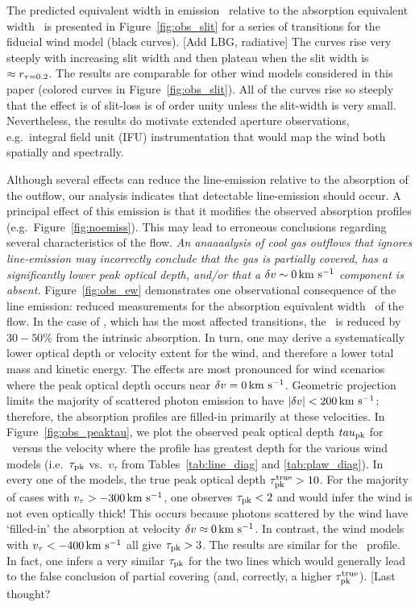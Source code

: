 \documentclass[12pt,preprint]{aastex}
\begin{document}
The predicted equivalent width in emission \ewe\ relative to the absorption
equivalent width \ewabs\ is presented in
Figure~\ref{fig:obs_slit} for a series of transitions for the fiducial
wind model (black curves).
[Add LBG, radiative]
The curves rise very steeply with increasing slit width and then
plateau when the slit width is $\approx r_{\tau = 0.2}$.  
The results are comparable for other wind models considered
in this paper (colored curves in Figure~\ref{fig:obs_slit}).
All of the curves rise so steeply that 
the effect is of slit-loss is of order unity
unless the slit-width is very small.   
Nevertheless, the results do motivate
extended aperture observations, e.g.\ integral field unit (IFU)
instrumentation that would map the wind both spatially and spectrally.


Although several effects can reduce the line-emission
relative to the absorption of the outflow, our analysis
indicates that detectable line-emission should occur. 
A principal effect of this emission is
that it modifies the observed absorption profiles (e.g.\
Figure~\ref{fig:noemiss}). This may lead to erroneous conclusions
regarding several characteristics of the flow.  {\it An anaaaalysis of cool gas outflows
that ignores line-emission may incorrectly conclude that the gas is
partially covered, has a significantly lower peak optical depth,
and/or that a $\delta v \sim 0 \, {\rm km~s^{-1}}$ component is
absent.}  Figure~\ref{fig:obs_ew} demonstrates one observational
consequence of the line emission: reduced measurements for the absorption
equivalent width \ewabs\ of the flow.  In the case of \ion{Mg}{2},
which has the most affected transitions, the \ewabs\ is reduced by
$30-50\%$ from the intrinsic absorption.  In turn, one may derive 
a systematically lower optical depth or velocity extent for the wind,
and therefore a lower total mass and kinetic energy.  
The effects are most pronounced for wind
scenarios where the peak optical depth occurs near $\delta v = 0 \, {\rm km~s^{-1}}$.
Geometric projection limits the majority of scattered photon emission to
have $|\delta v| < 200 \, {\rm km~s^{-1}}$; therefore,  the absorption profiles
are filled-in primarily at these velocities.  In
Figure~\ref{fig:obs_peaktau}, we plot the observed peak optical depth
$tau_{\rm pk}$ for \mgiia\ 
versus the velocity where the profile has greatest depth 
for the various wind models (i.e.\
$\tau_{\rm pk}$ vs.\ $v_\tau$ from Tables~\ref{tab:line_diag} and
\ref{tab:plaw_diag}).   In every one of the models, the true peak
optical depth $\tau_{\rm pk}^{\rm true} > 10$.  For the
majority of cases with $v_\tau > -300\, {\rm km~s^{-1}}$, one observes $\tau_{\rm pk} <
2$ and would infer the wind is not even optically thick!
This occurs because photons scattered by the wind have `filled-in' the
absorption at velocity $\delta v \approx 0 \, {\rm km~s^{-1}}$.  In contrast, the wind
models with $v_\tau < -400 \, {\rm km~s^{-1}}$ all give $\tau_{\rm pk} > 3$.  The
results are similar for the \mgiib\ profile.  In fact, one infers a
very similar $\tau_{\rm pk}$ for the two lines which would generally
lead to the false conclusion of partial covering (and, correctly, a
higher $\tau_{\rm pk}^{\rm true}$).  [Last thought?\
\end{document}
